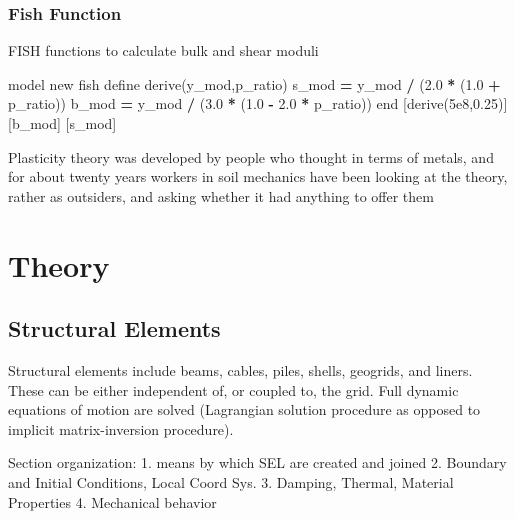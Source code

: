 \documentclass[a4paper, nobind]{templates/ociamthesis}
\newenvironment{Shaded}{\begin{snugshade}}{\end{snugshade}}
\newcommand{\FloatTok}[1]{\textcolor[rgb]{0.00,0.00,0.81}{#1}}
\newcommand{\NormalTok}[1]{#1}
\newcommand{\OperatorTok}[1]{\textcolor[rgb]{0.81,0.36,0.00}{\textbf{#1}}}
\renewenvironment{Shaded}
{
  \vspace{10pt}%
  \begin{snugshade}%
}{%
  \end{snugshade}%
  \vspace{8pt}%
}
\begin{document}
\hypertarget{fish-function}{%
\subsection{Fish Function}\label{fish-function}}

FISH functions to calculate bulk and shear moduli

\begin{Shaded}
\begin{Highlighting}[]
\NormalTok{model new}
\NormalTok{fish define derive(y\_mod,p\_ratio)}
\NormalTok{    s\_mod }\OperatorTok{=}\NormalTok{ y\_mod }\OperatorTok{/}\NormalTok{ (}\FloatTok{2.0} \OperatorTok{*}\NormalTok{ (}\FloatTok{1.0} \OperatorTok{+}\NormalTok{ p\_ratio))}
\NormalTok{    b\_mod }\OperatorTok{=}\NormalTok{ y\_mod }\OperatorTok{/}\NormalTok{ (}\FloatTok{3.0} \OperatorTok{*}\NormalTok{ (}\FloatTok{1.0} \OperatorTok{{-}} \FloatTok{2.0} \OperatorTok{*}\NormalTok{ p\_ratio))}
\NormalTok{end}
\NormalTok{[derive(}\FloatTok{5e8}\NormalTok{,}\FloatTok{0.25}\NormalTok{)]}
\NormalTok{[b\_mod] }
\NormalTok{[s\_mod]}
\end{Highlighting}
\end{Shaded}

\newpage

\begin{savequote}
Plasticity theory was developed by people who thought in terms of
metals, and for about twenty years workers in soil mechanics have been
looking at the theory, rather as outsiders, and asking whether it had
anything to offer them
\end{savequote}

\hypertarget{theory}{%
\chapter{Theory}\label{theory}}

\hypertarget{structural-elements-1}{%
\section{Structural Elements}\label{structural-elements-1}}

Structural elements include beams, cables, piles, shells, geogrids, and
liners. These can be either independent of, or coupled to, the grid.
Full dynamic equations of motion are solved (Lagrangian solution
procedure as opposed to implicit matrix-inversion procedure).

Section organization: 1. means by which SEL are created and joined 2.
Boundary and Initial Conditions, Local Coord Sys. 3. Damping, Thermal,
Material Properties 4. Mechanical behavior
\end{document}
